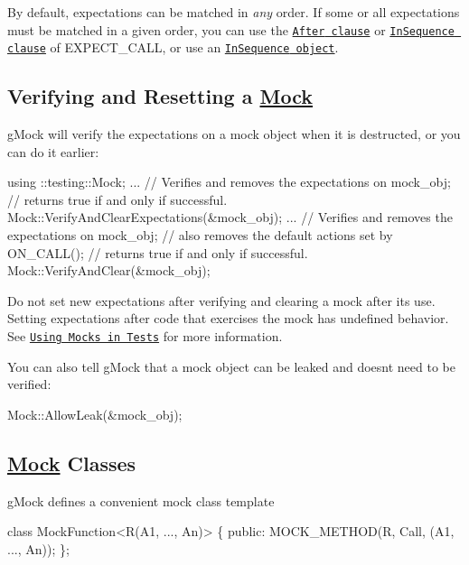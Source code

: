 By default, expectations can be matched in {\itshape any} order. If some or all expectations must be matched in a given order, you can use the \href{reference/mocking.md#EXPECT_CALL.After}{\tt {\ttfamily After} clause} or \href{reference/mocking.md#EXPECT_CALL.InSequence}{\tt {\ttfamily In\+Sequence} clause} of {\ttfamily E\+X\+P\+E\+C\+T\+\_\+\+C\+A\+LL}, or use an \href{reference/mocking.md#InSequence}{\tt {\ttfamily In\+Sequence} object}.

\subsection*{Verifying and Resetting a \mbox{\hyperlink{classMock}{Mock}}}

g\+Mock will verify the expectations on a mock object when it is destructed, or you can do it earlier\+:


\begin{DoxyCode}
using ::testing::Mock;
...
\textcolor{comment}{// Verifies and removes the expectations on mock\_obj;}
\textcolor{comment}{// returns true if and only if successful.}
Mock::VerifyAndClearExpectations(&mock\_obj);
...
\textcolor{comment}{// Verifies and removes the expectations on mock\_obj;}
\textcolor{comment}{// also removes the default actions set by ON\_CALL();}
\textcolor{comment}{// returns true if and only if successful.}
Mock::VerifyAndClear(&mock\_obj);
\end{DoxyCode}


Do not set new expectations after verifying and clearing a mock after its use. Setting expectations after code that exercises the mock has undefined behavior. See \href{gmock_for_dummies.md#using-mocks-in-tests}{\tt Using Mocks in Tests} for more information.

You can also tell g\+Mock that a mock object can be leaked and doesn\textquotesingle{}t need to be verified\+:


\begin{DoxyCode}
Mock::AllowLeak(&mock\_obj);
\end{DoxyCode}


\subsection*{\mbox{\hyperlink{classMock}{Mock}} Classes}

g\+Mock defines a convenient mock class template


\begin{DoxyCode}
\textcolor{keyword}{class }MockFunction<R(A1, ..., An)> \{
 \textcolor{keyword}{public}:
  MOCK\_METHOD(R, Call, (A1, ..., An));
\};
\end{DoxyCode}


